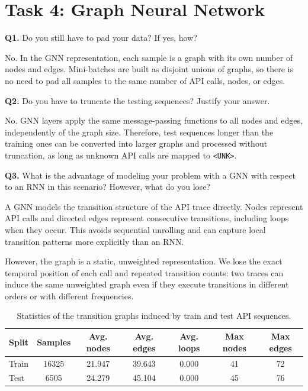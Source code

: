 \section{Task 4: Graph Neural Network}

\begin{questionbox}
\textbf{Q1.} Do you still have to pad your data? If yes, how?
\end{questionbox}

No. In the GNN representation, each sample is a graph with its own number of nodes and edges.
Mini-batches are built as disjoint unions of graphs, so there is no need to pad all samples to the
same number of API calls, nodes, or edges.

\begin{questionbox}
\textbf{Q2.} Do you have to truncate the testing sequences? Justify your answer.
\end{questionbox}

No. GNN layers apply the same message-passing functions to all nodes and edges, independently of the
graph size. Therefore, test sequences longer than the training ones can be converted into larger
graphs and processed without truncation, as long as unknown API calls are mapped to \texttt{<UNK>}.

\begin{questionbox}
\textbf{Q3.} What is the advantage of modeling your problem with a GNN with respect to an RNN in
this scenario? However, what do you lose?
\end{questionbox}

A GNN models the transition structure of the API trace directly. Nodes represent API calls and
directed edges represent consecutive transitions, including loops when they occur. This avoids
sequential unrolling and can capture local transition patterns more explicitly than an RNN.

However, the graph is a static, unweighted representation. We lose the exact temporal position of
each call and repeated transition counts: two traces can induce the same unweighted graph even if
they execute transitions in different orders or with different frequencies.

\begin{table}[h!]
\centering
\begin{tabular}{lcccccc}
\hline
\textbf{Split} & \textbf{Samples} & \textbf{Avg. nodes} & \textbf{Avg. edges} &
\textbf{Avg. loops} & \textbf{Max nodes} & \textbf{Max edges} \\
\hline
Train & 16325 & 21.947 & 39.643 & 0.000 & 41 & 72 \\
Test  & 6505  & 24.279 & 45.104 & 0.000 & 45 & 76 \\
\hline
\end{tabular}
\caption{Statistics of the transition graphs induced by train and test API sequences.}
\label{tab:task4_graph_stats}
\end{table}

